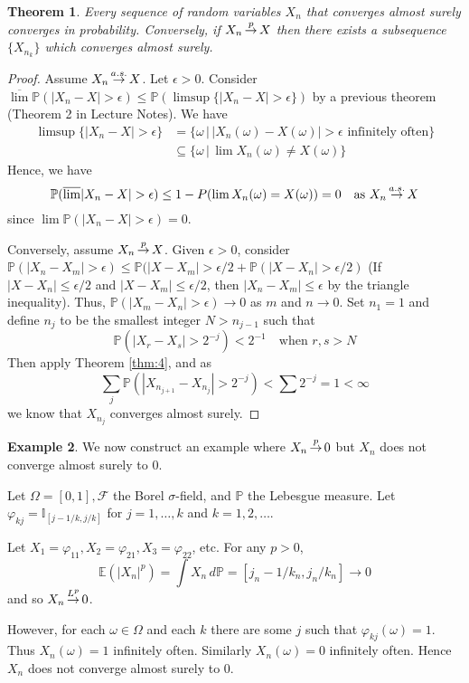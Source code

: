 \documentclass[10pt, oneside, reqno]{amsart}
\theoremstyle{plain}%
\newtheorem{thm}{Theorem}[section]
\theoremstyle{definition}
\newtheorem{exmp}[thm]{Example}
\theoremstyle{remark}
\renewcommand{\phi}{\varphi}
\newcommand{\sigf}{\mathcal{F}}
\newcommand{\E}{\mathbb{E}}
\newcommand{\I}{\mathbb{I}}
\renewcommand{\P}{\mathbb{P}}
\def\cip{\,{\buildrel p \over \rightarrow}\,}
\def\cas{\,{\buildrel a.s. \over \rightarrow}\,}
\def\clp{\,{\buildrel L^p \over \rightarrow}\,}
\begin{document}
\begin{thm}Every sequence of random variables $X_n$ that converges almost surely converges in probability.  Conversely, if $X_n \cip X$ then there exists a subsequence $\{ X_{n_k} \}$ which converges almost surely.  
\end{thm}
\begin{proof}
    Assume $X_n \cas X$.  Let $\epsilon > 0$.  Consider $\overline \lim \P( |X_n - X | > \epsilon) \leq \P( \limsup \{ |X_n - X | > \epsilon \} )$ by a previous theorem (Theorem 2 in Lecture Notes).  We have \begin{align*}
        \limsup \{ | X_n - X | > \epsilon \} &= \{ \omega \, | \, | X_n(\omega) - X(\omega)| > \epsilon \text{ infinitely often} \} \\
                                            &\subseteq \{ \omega \, | \, \lim X_n (\omega) \neq X(\omega) \}
    \end{align*}
    Hence, we have \[
        \P( \overline \lim | X_n - X | > \epsilon ) \leq 1 - P (\lim X_n(\omega) = X(\omega)) = 0 \quad \text{as $X_n \cas X$}
    \] since $\lim \P( |X_n - X | > \epsilon) = 0$.
    
    Conversely, assume $X_n \cip X$.  Given $\epsilon > 0$, consider $\P(|X_n - X_m | > \epsilon) \leq \P(|X- X_m | > \epsilon/2 + \P( | X- X_n | > \epsilon/2 )$ (If $|X-X_n| \leq \epsilon/2$ and $|X-X_m| \leq \epsilon/2$, then $|X_n - X_m| \leq \epsilon$ by the triangle inequality). 
    Thus, $\P(|X_m - X_n | > \epsilon) \rightarrow 0$ as $m$ and $n \rightarrow 0$.  Set $n_1 = 1$ and define $n_j$ to be the smallest integer $N > n_{j-1}$ such that \[
        \P(|X_r - X_s| > 2^{-j} ) < 2^{-1} \quad \text{when $r, s > N$}
    \]
    Then apply Theorem \ref{thm:4}, and as \[
        \sum_j \P( |X_{n_{j+1}} - X_{n_j} | > 2^{-j}) < \sum 2^{-j} = 1 < \infty
    \] we know that $X_{n_j}$ converges almost surely.
    
\end{proof}
\begin{exmp}\label{exmp:cip_does_not_imply_as}
    We now construct an example where $X_n \cip 0$ but $X_n$ does not converge almost surely to $0$.  

    Let $\Omega = [0,1], \sigf$ the Borel $\sigma$-field, and $\P$ the Lebesgue measure.  Let $\phi_{kj} = \I_{[j-1/k, j/k]}$ for $j = 1, \dots, k$ and $k = 1, 2, \dots$.  

    Let $X_1 = \phi_{11}, X_2 = \phi_{21}, X_3 = \phi_{22}$, etc.  For any $p > 0$, \[
        \E(|X_n|^p) = \int X_n \, d\P = [ j_n - 1/k_n, j_n/k_n] \rightarrow 0
    \] and so $X_n \clp 0$.
    
    However, for each $\omega \in \Omega$ and each $k$ there are some $j$ such that $\phi_{kj}(\omega) = 1$.  Thus $X_n(\omega) = 1$ infinitely often. Similarly $X_n(\omega) = 0$ infinitely often.  Hence $X_n$ does not converge almost surely to 0.
\end{exmp}
\end{document}
